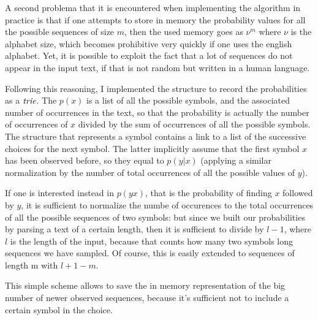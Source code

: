 \documentclass[11pt]{article} %
\begin{document}
A second problema that it is encountered when implementing the algorithm in practice is that if one attempts to store in memory the probability values for all the possible sequences of size $m$, then the used memory goes as $\nu^m$ where $\nu$ is the alphabet size, which becomes prohibitive very quickly if one uses the english alphabet. Yet, it is possible to exploit the fact that a lot of sequences do not appear in the input text, if that is not random but written in a human language.

Following this reasoning, I implemented the structure to record the probabilities as a $\emph{trie}$. The $p(x)$ is a list of all the possible symbols, and the associated number of occurrences in the text, so that the probability is actually the number of occurrences of $x$ divided by the sum of occurrences of all the possible symbols. The structure that represents a symbol contains a link to a list of the successive choices for the next symbol. The latter implicitly assume that the first symbol $x$ has been observed before, so they equal to $p(y|x)$ (applying a similar normalization by the number of total occurrences of all the possible values of $y$).

If one is interested instead in $p(yx)$, that is the probability of finding $x$ followed by $y$, it is sufficient to normalize the numbe of occurences to the total occurrences of all the possible sequences of two symbols: but since we built our probabilities by parsing a text of a certain length, then it is sufficient to divide by $l-1$, where $l$ is the length of the input, because that counts how many two symbols long sequences we have sampled. Of course, this is easily extended to sequences of length m with $l+1-m$.

This simple scheme allows to save the in memory representation of the big number of newer observed sequences, because it's sufficient not to include a certain symbol in the choice.
\end{document}
